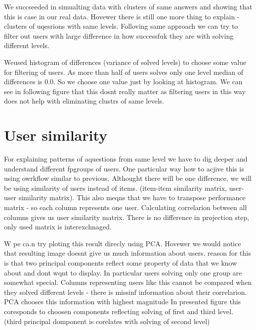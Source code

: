 \documentclass[
  digital, %
  table,   %
  nolof,     %
  nolot,     %
  nocover
]{fithesis3}
\begin{document}
We succseeded in simualting data with clusters of same answers and
showing that this is case in our real data. Hovewer there is still one
more thing to explain - clusters of uqesrions with same levels.
Folloving same approach we can try to filter out users with large
difference in how successfuk they are with solving different levels.

Weused histogram of differences (variance of solved levels) to choose
some value for filtering of users. As more than half of users solves
only one level median of differences is 0.0. So we choose one value just
by looking at histogram. We can see in following figure that this dosnt
really matter as filtering users in this way does not help with
eliminating clustrs of same levels.



\section{User similarity}\label{user-similarity}


For explaining patterns of aquestions from same level we have to dig
deeper and understand different fpgroups of users. One particular way
how to acjive this is using owrkflow similar to previous. Althought
there will be one difference, we will be using similarity of users
instead of items. (item-item similarity matrix, user-user similarity
matrix). This also meqns that we have to transpose performance matrix -
so each column represents one user. Calculating correlarion between all
columns gives us user similarity matrix. There is no difference in
projection step, only used matrix is interexchnaged.

W pe ca.n try ploting this result direcly using PCA. Hovewer we would
notice that resulting image doesnt give us much information about users.
reason for this is that two principal components reflect some property
of data that we know about and dont wqnt to display. In particular users
solving only one group are somewhat special. Columns representing users
like this cannot be compared when they solved different levels - there
is missinf information about their correlarion. PCA chooses this
information with highest magnitude In presented figure this coresponds
to choosen components reflecting solving of first and third level.
(third principal domponent is corelates with solving of second level)
\end{document}
